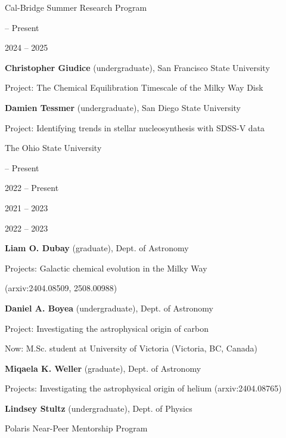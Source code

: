 \documentclass[cv.tex]{subfiles}
\begin{document}
{\color{themecolor} \large Cal-Bridge Summer Research Program}
\par\noindent
\parbox{0.18\textwidth}{%
	 -- Present \par
	\null \par
	2024 -- 2025 \par
	\null \par
}
\hspace{1mm}
\parbox{0.8\textwidth}{%
	\vspace{1mm}
	\textbf{Christopher Giudice} (undergraduate), San Francisco State University \par
	Project: The Chemical Equilibration Timescale of the Milky Way Disk \par
	\textbf{Damien Tessmer} (undergraduate), San Diego State University \par
	Project: Identifying trends in stellar nucleosynthesis with SDSS-V data \par
}

\newpage
\vspace{3mm}
\noindent
{\color{themecolor} \large The Ohio State University}
\par\noindent
\parbox{0.18\textwidth}{%
	 -- Present \par
	\null \par
	\null\par
	2022 -- Present \par
	\null \par
	\null \par
	2021 -- 2023 \par
	\null \par
	2022 -- 2023 \par
	\null
}
\hspace{1mm}
\parbox{0.8\textwidth}{%
	\vspace{1mm}
	\textbf{Liam O. Dubay} (graduate), Dept. of Astronomy \par
	Projects: Galactic chemical evolution in the Milky Way \par
	(arxiv:2404.08509, 2508.00988) \par
	\textbf{Daniel A. Boyea} (undergraduate), Dept. of Astronomy \par
	Project: Investigating the astrophysical origin of carbon \par
	Now: M.Sc. student at University of Victoria (Victoria, BC, Canada) \par
	\textbf{Miqaela K. Weller} (graduate), Dept. of Astronomy \par
	Projects: Investigating the astrophysical origin of helium
	(arxiv:2404.08765) \par
	\textbf{Lindsey Stultz} (undergraduate), Dept. of Physics \par
	Polaris Near-Peer Mentorship Program
}
\end{document}
